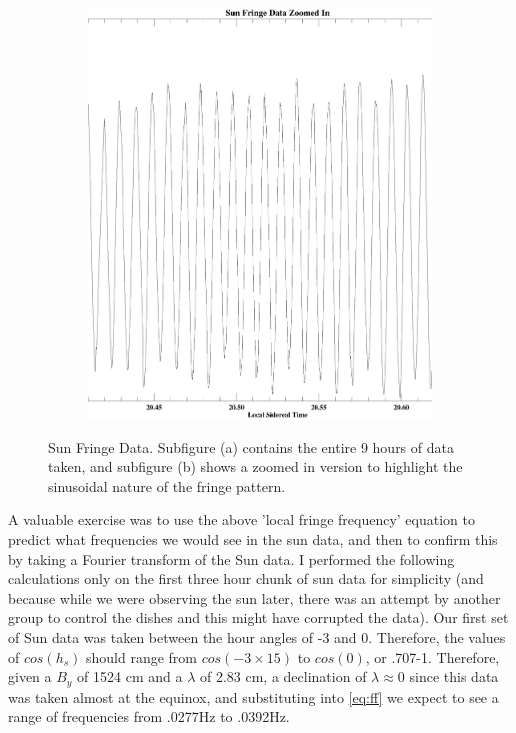 \documentclass{article}
\begin{document}
\begin{figure}
\begin{subfigure}[b]{\textwidth}
                \includegraphics[width=6in]{sun_fringe_zoom.ps}
                \caption{}
                \label{fig:fringezoom}
        \end{subfigure}


        \caption{Sun Fringe Data. Subfigure (a) contains the entire 9 hours of data taken, and subfigure (b) shows a zoomed in version to highlight the sinusoidal nature of the fringe pattern.}\label{fig:fringe}
\end{figure}


A valuable exercise was to use the above 'local fringe frequency' equation to predict what frequencies we would see in the sun data, and then to confirm this by taking a Fourier transform of the Sun data. I performed the following calculations only on the first three hour chunk of sun data for simplicity (and because while we were observing the sun later, there was an attempt by another group to control the dishes and this might have corrupted the data). Our first set of Sun data was taken between the hour angles of -3 and 0. Therefore, the values of $cos(h_s)$ should range from $cos(-3\times 15)$ to $cos(0)$, or .707-1. Therefore, given a $B_y$ of 1524 cm and a $\lambda$ of 2.83 cm, a declination of $\lambda\approx0$ since this data was taken almost at the equinox, and substituting into \autoref{eq:ff} we expect to see a range of frequencies from .0277Hz to .0392Hz.
\end{document}
